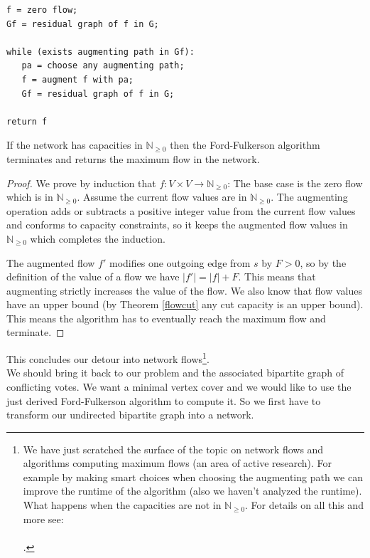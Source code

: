 \begin{lstlisting}[basicstyle=\small, label={lst:fordfulkerson}, frame=trBL, caption={Ford-Fulkerson algorithm}]
f = zero flow;
Gf = residual graph of f in G;

while (exists augmenting path in Gf):
   pa = choose any augmenting path; 
   f = augment f with pa;
   Gf = residual graph of f in G;

return f  
\end{lstlisting}

\begin{thm}\label{fordfulkerson}
If the network has capacities in $\mathbb{N}_{\geq 0}$ then the Ford-Fulkerson algorithm terminates and returns the maximum flow in the network.
\end{thm}

\begin{proof}
We prove by induction that $f: V \times V \to \mathbb{N}_{\geq 0}$: The base case is the zero flow which is in $\mathbb{N}_{\geq 0}$. Assume the current flow values are in $\mathbb{N}_{\geq 0}$. The augmenting operation adds or subtracts a positive integer value from the current flow values and conforms to capacity constraints, so it keeps the augmented flow values in $\mathbb{N}_{\geq 0}$ which completes the induction.

The augmented flow $f'$ modifies one outgoing edge from $s$ by $F > 0$, so by the definition of the value of a flow we have $|f'| = |f| + F$. This means that augmenting strictly increases the value of the flow. We also know that flow values have an upper bound (by Theorem \ref{flowcut} any cut capacity is an upper bound). This means the algorithm has to eventually reach the maximum flow and terminate.
\end{proof}

This concludes our detour into network flows\footnote{We have just scratched the surface of the topic on network flows and algorithms computing maximum flows (an area of active research). For example by making smart choices when choosing the augmenting path we can improve the runtime of the algorithm (also we haven't analyzed the runtime). What happens when the capacities are not in $\mathbb{N}_{\geq 0}$. For details on all this and more see:
\\
\\ 
.}.
\\
We should bring it back to our problem and the associated bipartite graph of conflicting votes. We want a minimal vertex cover and we would like to use the just derived Ford-Fulkerson algorithm to compute it. So we first have to transform our undirected bipartite graph into a network. 

